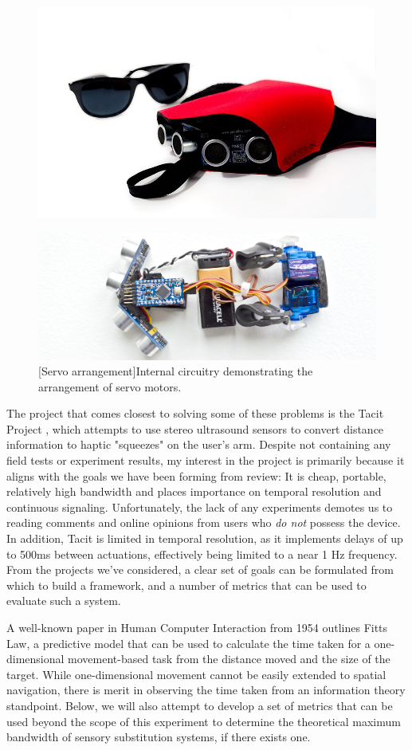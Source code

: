 \documentclass[
12pt, %
oneside, %
english, %
doublespacing, %
headsepline, %
]{MastersDoctoralThesis} %
\begin{document}
\begin{figure}
\centering
\begin{minipage}{.5\textwidth}
  \centering
  \includegraphics[width=.35\linewidth]{images/tacit}
  \label{fig:tacit1}
\end{minipage}%
\begin{minipage}{.5\textwidth}
  \centering
  \includegraphics[width=.5\linewidth]{images/tacit2}
  [Servo arrangement]{Internal circuitry demonstrating the arrangement of servo motors.}
  \label{fig:tacit2}
\end{minipage}
\end{figure}

The project that comes closest to solving some of these problems is the Tacit Project \parencite{hoefer_meet_nodate}, which attempts to use stereo ultrasound sensors to convert distance information to haptic "squeezes" on the user's arm. Despite not containing any field tests or experiment results, my interest in the project is primarily because it aligns with the goals we have been forming from review: It is cheap, portable, relatively high bandwidth and places importance on temporal resolution and continuous signaling. Unfortunately, the lack of any experiments demotes us to reading comments and online opinions from users who \emph{do not} possess the device. In addition, Tacit is limited in temporal resolution, as it implements delays of up to 500ms between actuations, effectively being limited to a near 1 Hz frequency.
From the projects we've considered, a clear set of goals can be formulated from which to build a framework, and a number of metrics that can be used to evaluate such a system.

A well-known paper \parencite{m._fitts_information_1992} in Human Computer Interaction from 1954 outlines Fitts Law, a predictive model that can be used to calculate the time taken for a one-dimensional movement-based task from the distance moved and the size of the target. While one-dimensional movement cannot be easily extended to spatial navigation, there is merit in observing the time taken from an information theory standpoint. Below, we will also attempt to develop a set of metrics that can be used beyond the scope of this experiment to determine the theoretical maximum bandwidth of sensory substitution systems, if there exists one.
\end{document}
